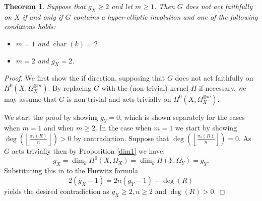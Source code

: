 \documentclass[11pt]{article} %
\newtheorem{thm}{Theorem}
\DeclareMathOperator{\cha}{char}
\begin{document}
  \begin{thm}
    Suppose that $g_X\geq 2$ and let $m\geq1$. 
    Then $G$ does not act faithfully on $X$ if and only if $G$ contains a hyper-elliptic involution and one of the following conditions holds:
      \begin{itemize}
	\item $m=1$ and $\cha(k)=2$
	\item $m=2$ and $g_X=2$.
      \end{itemize}
  \end{thm}
  \begin{proof}
    We first show the if direction, supposing that $G$ does not act faithfully on $H^0(X,\Omega_X^{\otimes m})$. 
    By replacing $G$ with the (non-trivial) kernel $H$ if necessary, we may assume that $G$ is non-trivial and acts trivially on $H^0(X,\Omega_X^{\otimes m})$.


    We start the proof by showing $g_Y=0$, which is shown separately for the cases when $m=1$ and when $m\geq 2$.
    In the case when $m=1$ we start by showing $\deg \left( \left\lfloor \frac {\pi_*(R)}{n} \right\rfloor \right)>0$ by contradiction.
    Suppose that $\deg \left( \left\lfloor \frac{\pi_*(R)}{n} \right\rfloor \right) =0$.
    As $G$ acts trivially then by Proposition \ref{dim1} we have:
      \begin{equation*}
	g_X=\dim_k H^0(X,\Omega_X)=\dim_k H(Y,\Omega_Y)=g_Y.
      \end{equation*}
    Substituting this in to the Hurwitz formula 
      \begin{equation}\label{eq:hur}
	2(g_X-1)=2n(g_Y-1)+\deg(R)
      \end{equation}
    yields the desired contradiction as $g_X\geq 2, n\geq 2$ and $\deg(R)>0$.


\end{proof}
\end{document}
